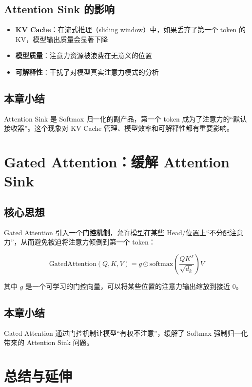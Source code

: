 \documentclass[a4paper]{article}
\begin{document}
\subsection{Attention Sink 的影响}

\begin{itemize}
  \item \textbf{KV Cache}：在流式推理（sliding window）中，如果丢弃了第一个 token 的 KV，模型输出质量会显著下降
  \item \textbf{模型质量}：注意力资源被浪费在无意义的位置
  \item \textbf{可解释性}：干扰了对模型真实注意力模式的分析
\end{itemize}

\subsection{本章小结}

Attention Sink 是 Softmax 归一化的副产品，第一个 token 成为了注意力的``默认接收器''。这个现象对 KV Cache 管理、模型效率和可解释性都有重要影响。

\section{Gated Attention：缓解 Attention Sink}

\subsection{核心思想}

Gated Attention 引入一个\textbf{门控机制}，允许模型在某些 Head/位置上``不分配注意力''，从而避免被迫将注意力倾倒到第一个 token：

$$
\text{GatedAttention}(Q, K, V) = g \odot \text{softmax}\left(\frac{QK^T}{\sqrt{d_k}}\right) V
$$

其中 $g$ 是一个可学习的门控向量，可以将某些位置的注意力输出缩放到接近 0。

\subsection{本章小结}

Gated Attention 通过门控机制让模型``有权不注意''，缓解了 Softmax 强制归一化带来的 Attention Sink 问题。

\section{总结与延伸}
\end{document}
